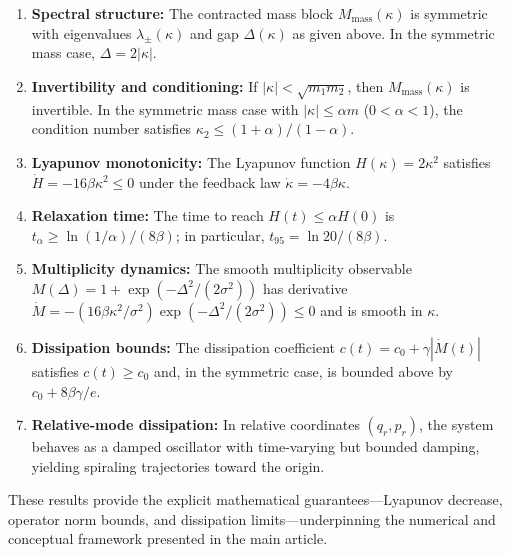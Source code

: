 \documentclass[11pt]{article}
\begin{document}
\begin{enumerate}[label=(\arabic*)]
  \item \textbf{Spectral structure:} The contracted mass block $M_{\text{mass}}(\kappa)$ is symmetric with eigenvalues $\lambda_\pm(\kappa)$ and gap $\Delta(\kappa)$ as given above. In the symmetric mass case, $\Delta=2|\kappa|$.
  \item \textbf{Invertibility and conditioning:} If $|\kappa|<\sqrt{m_1 m_2}$, then $M_{\text{mass}}(\kappa)$ is invertible. In the symmetric mass case with $|\kappa|\le \alpha m$ ($0<\alpha<1$), the condition number satisfies $\kappa_2 \le (1+\alpha)/(1-\alpha)$.
  \item \textbf{Lyapunov monotonicity:} The Lyapunov function $H(\kappa)=2\kappa^2$ satisfies $\dot H = -16\beta\kappa^2\le 0$ under the feedback law $\dot\kappa=-4\beta\kappa$.
  \item \textbf{Relaxation time:} The time to reach $H(t)\le \alpha H(0)$ is $t_\alpha \ge \ln(1/\alpha)/(8\beta)$; in particular, $t_{95} = \ln 20/(8\beta)$.
  \item \textbf{Multiplicity dynamics:} The smooth multiplicity observable $M(\Delta)=1+\exp(-\Delta^2/(2\sigma^2))$ has derivative $\dot M = -(16\beta\kappa^2/\sigma^2)\exp(-\Delta^2/(2\sigma^2))\le 0$ and is smooth in $\kappa$.
  \item \textbf{Dissipation bounds:} The dissipation coefficient $c(t)=c_0+\gamma|\dot M(t)|$ satisfies $c(t)\ge c_0$ and, in the symmetric case, is bounded above by $c_0 + 8\beta\gamma/e$.
  \item \textbf{Relative-mode dissipation:} In relative coordinates $(q_r,p_r)$, the system behaves as a damped oscillator with time-varying but bounded damping, yielding spiraling trajectories toward the origin.
\end{enumerate}

These results provide the explicit mathematical guarantees---Lyapunov decrease, operator norm bounds, and dissipation limits---underpinning the numerical and conceptual framework presented in the main article.
\nocite{*}


\end{document}
